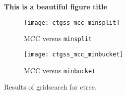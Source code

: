 \begin{figure}[htp]
    \centering
    \textbf{This is a beautiful figure title}\par\medskip
    \begin{subfigure}[b]{.3\textwidth}
        \centering
        \texttt{[image: ctgss\_mcc\_minsplit]}
        \cprotect\caption{MCC versus \verb|minsplit|}
        \label{fig:ctgss_mcc_minsplit}
    \end{subfigure}
    \hfill
    \begin{subfigure}[b]{.3\textwidth}
        \centering
        \texttt{[image: ctgss\_mcc\_minbucket]}
        \cprotect\caption{MCC versus \verb|minbucket|}
        \label{fig:ctgss_mcc_minbucket}
    \end{subfigure}
    \hspace*{\fill}

    \caption{Results of gridsearch for ctree.}
\end{figure}
